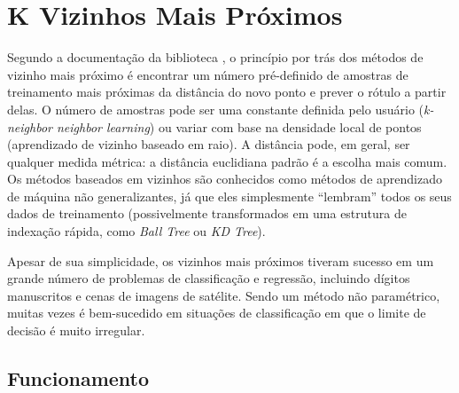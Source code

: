 \section{K Vizinhos Mais Próximos}

Segundo a documentação da biblioteca \cite{scikitlearn}, o princípio por trás dos métodos de vizinho mais próximo é encontrar um número pré-definido de amostras de treinamento mais próximas da distância do novo ponto e prever o rótulo a partir delas. O número de amostras pode ser uma constante definida pelo usuário (\textit{k-neighbor neighbor learning}) ou variar com base na densidade local de pontos (aprendizado de vizinho baseado em raio). A distância pode, em geral, ser qualquer medida métrica: a distância euclidiana padrão é a escolha mais comum. Os métodos baseados em vizinhos são conhecidos como métodos de aprendizado de máquina não generalizantes, já que eles simplesmente “lembram” todos os seus dados de treinamento (possivelmente transformados em uma estrutura de indexação rápida, como \textit{Ball Tree} ou \textit{KD Tree}).

Apesar de sua simplicidade, os vizinhos mais próximos tiveram sucesso em um grande número de problemas de classificação e regressão, incluindo dígitos manuscritos e cenas de imagens de satélite. Sendo um método não paramétrico, muitas vezes é bem-sucedido em situações de classificação em que o limite de decisão é muito irregular.

\subsection{Funcionamento}

